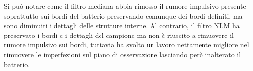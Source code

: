 \documentclass[../main.tex]{subfiles}
\begin{document}
Si può notare come il filtro mediana abbia rimosso il rumore impulsivo presente soprattutto sui bordi del batterio preservando comunque dei bordi definiti, ma sono diminuiti i dettagli delle strutture interne. Al contrario, il filtro NLM ha preservato i bordi e i dettagli del campione ma non è riuscito a rimuovere il rumore impulsivo sui bordi, tuttavia ha svolto un lavoro nettamente migliore nel rimuovere le imperfezioni sul piano di osservazione lasciando però inalterato il batterio.
\end{document}
